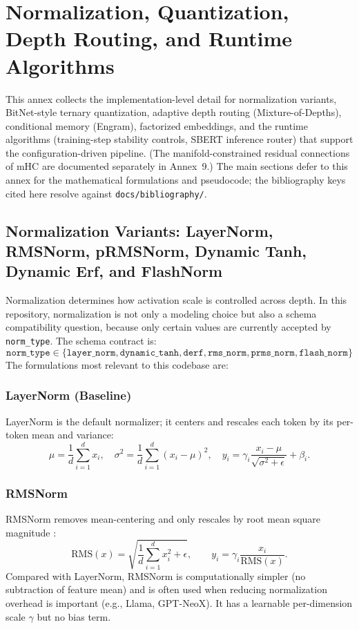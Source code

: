 \section{Normalization, Quantization, Depth Routing, and Runtime Algorithms}
\label{sec:annex-norm-bitnet-mod}

This annex collects the implementation-level detail for normalization variants, BitNet-style ternary quantization, adaptive depth routing (Mixture-of-Depths), conditional memory (Engram), factorized embeddings, and the runtime algorithms (training-step stability controls, SBERT inference router) that support the configuration-driven pipeline. (The manifold-constrained residual connections of mHC are documented separately in Annex~9.) The main sections defer to this annex for the mathematical formulations and pseudocode; the bibliography keys cited here resolve against \texttt{docs/bibliography/}.

\subsection{Normalization Variants: LayerNorm, RMSNorm, pRMSNorm, Dynamic Tanh, Dynamic Erf, and FlashNorm}

Normalization determines how activation scale is controlled across depth. In this repository, normalization is not only a modeling choice but also a schema compatibility question, because only certain values are currently accepted by \texttt{norm\_type}. The schema contract is:
\[
\texttt{norm\_type} \in \{\texttt{layer\_norm}, \texttt{dynamic\_tanh}, \texttt{derf}, \texttt{rms\_norm}, \texttt{prms\_norm}, \texttt{flash\_norm}\}
\]
The formulations most relevant to this codebase are:

\subsubsection{LayerNorm (Baseline)}
LayerNorm \citep{ba2016layer} is the default normalizer; it centers and rescales each token by its per-token mean and variance:
\[
\mu = \frac{1}{d}\sum_{i=1}^{d} x_i, \quad \sigma^2 = \frac{1}{d}\sum_{i=1}^{d}(x_i - \mu)^2, \quad y_i = \gamma_i \frac{x_i - \mu}{\sqrt{\sigma^2 + \epsilon}} + \beta_i.
\]

\subsubsection{RMSNorm}
RMSNorm removes mean-centering and only rescales by root mean square magnitude \citep{zhang_root_2019}:
\[
\mathrm{RMS}(x)=\sqrt{\frac{1}{d}\sum_{i=1}^{d}x_i^2+\epsilon},\qquad
y_i=\gamma_i\frac{x_i}{\mathrm{RMS}(x)}.
\]
Compared with LayerNorm, RMSNorm is computationally simpler (no subtraction of feature mean) and is often used when reducing normalization overhead is important (e.g., Llama, GPT-NeoX). It has a learnable per-dimension scale $\gamma$ but no bias term.


